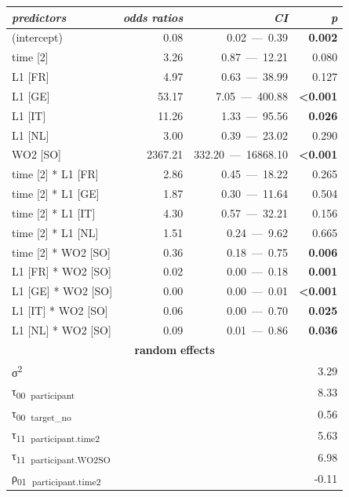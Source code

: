 \begin{table}
    \begin{tabularx}{\textwidth}{Xrrr}
    \lsptoprule
    \textit{predictors} & \textit{odds} \textit{ratios} & \textit{CI} & \textit{p}\\
    \midrule
    (intercept) & 0.08 & 0.02~—~0.39 & \textbf{0.002}\\
    time [2] & 3.26 & 0.87~—~12.21 & 0.080\\
    L1 [FR] & 4.97 & 0.63~—~38.99 & 0.127\\
    L1 [GE] & 53.17 & 7.05~—~400.88 & \textbf{<0.001}\\
    L1 [IT] & 11.26 & 1.33~—~95.56 & \textbf{0.026}\\
    L1 [NL] & 3.00 & 0.39~—~23.02 & 0.290\\
    WO2 [SO] & 2367.21 & 332.20~—~16868.10 & \textbf{<0.001}\\
    time [2] * L1 [FR] & 2.86 & 0.45~—~18.22 & 0.265\\
    time [2] * L1 [GE] & 1.87 & 0.30~—~11.64 & 0.504\\
    time [2] * L1 [IT] & 4.30 & 0.57~—~32.21 & 0.156\\
    time [2] * L1 [NL] & 1.51 & 0.24~—~9.62 & 0.665\\
    time [2] * WO2 [SO] & 0.36 & 0.18~—~0.75 & \textbf{0.006}\\
    L1 [FR] * WO2 [SO] & 0.02 & 0.00~—~0.18 & \textbf{0.001}\\
    L1 [GE] * WO2 [SO] & 0.00 & 0.00~—~0.01 & \textbf{<0.001}\\
    L1 [IT] * WO2 [SO] & 0.06 & 0.00~—~0.70 & \textbf{0.025}\\
    L1 [NL] * WO2 [SO] & 0.09 & 0.01~—~0.86 & \textbf{0.036}\\
    \multicolumn{4}{c}{\textbf{random} \textbf{effects}}\\
    σ\textsuperscript{2} & \multicolumn{3}{r}{3.29}\\
    τ\textsubscript{00}~\textsubscript{participant} & \multicolumn{3}{r}{8.33}\\
    τ\textsubscript{00}~\textsubscript{target\_no} & \multicolumn{3}{r}{0.56}\\
    τ\textsubscript{11}~\textsubscript{participant.time2} & \multicolumn{3}{r}{5.63}\\
    τ\textsubscript{11}~\textsubscript{participant.WO2SO} & \multicolumn{3}{r}{6.98}\\
    ρ\textsubscript{01}~\textsubscript{participant.time2} & \multicolumn{3}{r}{{}-0.11}\\

\end{tabularx}
\end{table}
